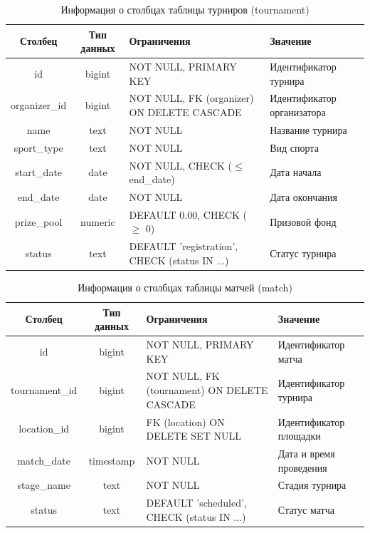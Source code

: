 \begin{table}[H]
	\begin{center}
		\caption{Информация о столбцах таблицы турниров (tournament)}
		\begin{tabular}{|c|c|>{\centering\arraybackslash}m{5cm}|>{\centering\arraybackslash}m{3.5cm}|}
			\hline
			Столбец & Тип данных & Ограничения & Значение \\
			\hline
			id & bigint & NOT NULL, PRIMARY KEY & Идентификатор турнира \\
			\hline
			organizer\_id & bigint & NOT NULL, FK (organizer) ON DELETE CASCADE & Идентификатор организатора \\
			\hline
			name & text & NOT NULL & Название турнира \\
			\hline
			sport\_type & text & NOT NULL & Вид спорта \\
			\hline
			start\_date & date & NOT NULL, CHECK ($\le$ end\_date) & Дата начала \\
			\hline
			end\_date & date & NOT NULL & Дата окончания \\
			\hline
			prize\_pool & numeric & DEFAULT 0.00, CHECK ($\ge$ 0) & Призовой фонд \\
			\hline
			status & text & DEFAULT 'registration', CHECK (status IN ...) & Статус турнира \\
			\hline
		\end{tabular}
		\label{table:db:tournament}
	\end{center}
\end{table}

\begin{table}[H]
	\begin{center}
		\caption{Информация о столбцах таблицы матчей (match)}
		\begin{tabular}{|c|c|>{\centering\arraybackslash}m{5cm}|>{\centering\arraybackslash}m{3.5cm}|}
			\hline
			Столбец & Тип данных & Ограничения & Значение \\
			\hline
			id & bigint & NOT NULL, PRIMARY KEY & Идентификатор матча \\
			\hline
			tournament\_id & bigint & NOT NULL, FK (tournament) ON DELETE CASCADE & Идентификатор турнира \\
			\hline
			location\_id & bigint & FK (location) ON DELETE SET NULL & Идентификатор площадки \\
			\hline
			match\_date & timestamp & NOT NULL & Дата и время проведения \\
			\hline
			stage\_name & text & NOT NULL & Стадия турнира \\
			\hline
			status & text & DEFAULT 'scheduled', CHECK (status IN ...) & Статус матча \\
			\hline
		\end{tabular}
		\label{table:db:match}
	\end{center}
\end{table}

